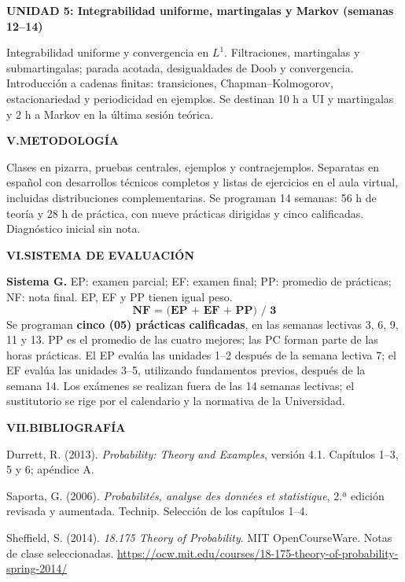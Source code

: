 \documentclass[10pt,a4paper]{article}
\newcommand{\seccion}[1]{\vspace{5pt}\noindent\textbf{#1}\par\vspace{2pt}}
\newcommand{\unidad}[1]{\vspace{3pt}\noindent\textbf{#1}\par\vspace{1pt}}
\begin{document}
\unidad{UNIDAD 5: Integrabilidad uniforme, martingalas y Markov (semanas 12--14)}
Integrabilidad uniforme y convergencia en $L^1$. Filtraciones, martingalas y submartingalas; parada acotada, desigualdades de Doob y convergencia. Introducción a cadenas finitas: transiciones, Chapman--Kolmogorov, estacionariedad y periodicidad en ejemplos. Se destinan 10 h a UI y martingalas y 2 h a Markov en la última sesión teórica.

\seccion{V.\quad METODOLOGÍA}
Clases en pizarra, pruebas centrales, ejemplos y contraejemplos. Separatas en español con desarrollos técnicos completos y listas de ejercicios en el aula virtual, incluidas distribuciones complementarias. Se programan 14 semanas: 56 h de teoría y 28 h de práctica, con nueve prácticas dirigidas y cinco calificadas. Diagnóstico inicial sin nota.

\seccion{VI.\quad SISTEMA DE EVALUACIÓN}
\textbf{Sistema G.} EP: examen parcial; EF: examen final; PP: promedio de prácticas; NF: nota final. EP, EF y PP tienen igual peso.
\[
\textbf{NF = (EP + EF + PP) / 3}
\]
Se programan \textbf{cinco (05) prácticas calificadas}, en las semanas lectivas 3, 6, 9, 11 y 13. PP es el promedio de las cuatro mejores; las PC forman parte de las horas prácticas. El EP evalúa las unidades 1--2 después de la semana lectiva 7; el EF evalúa las unidades 3--5, utilizando fundamentos previos, después de la semana 14. Los exámenes se realizan fuera de las 14 semanas lectivas; el sustitutorio se rige por el calendario y la normativa de la Universidad.

\seccion{VII.\quad BIBLIOGRAFÍA}
Durrett, R. (2013). \textit{Probability: Theory and Examples}, versión 4.1. Capítulos 1--3, 5 y 6; apéndice A.\par
Saporta, G. (2006). \textit{Probabilités, analyse des données et statistique}, 2.ª edición revisada y aumentada. Technip. Selección de los capítulos 1--4.\par
Sheffield, S. (2014). \textit{18.175 Theory of Probability}. MIT OpenCourseWare. Notas de clase seleccionadas. \url{https://ocw.mit.edu/courses/18-175-theory-of-probability-spring-2014/}
\end{document}
